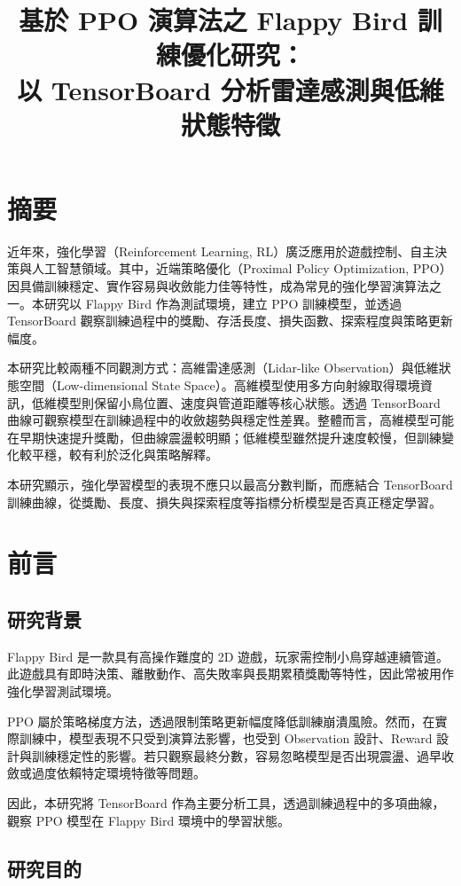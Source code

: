 \documentclass[12pt,a4paper]{ctexart}
\title{基於 PPO 演算法之 Flappy Bird 訓練優化研究：\\以 TensorBoard 分析雷達感測與低維狀態特徵}
\author{}
\date{}
\begin{document}
\maketitle

\section*{摘要}

近年來，強化學習（Reinforcement Learning, RL）廣泛應用於遊戲控制、自主決策與人工智慧領域。其中，近端策略優化（Proximal Policy Optimization, PPO）因具備訓練穩定、實作容易與收斂能力佳等特性，成為常見的強化學習演算法之一。本研究以 Flappy Bird 作為測試環境，建立 PPO 訓練模型，並透過 TensorBoard 觀察訓練過程中的獎勵、存活長度、損失函數、探索程度與策略更新幅度。

本研究比較兩種不同觀測方式：高維雷達感測（Lidar-like Observation）與低維狀態空間（Low-dimensional State Space）。高維模型使用多方向射線取得環境資訊，低維模型則保留小鳥位置、速度與管道距離等核心狀態。透過 TensorBoard 曲線可觀察模型在訓練過程中的收斂趨勢與穩定性差異。整體而言，高維模型可能在早期快速提升獎勵，但曲線震盪較明顯；低維模型雖然提升速度較慢，但訓練變化較平穩，較有利於泛化與策略解釋。

本研究顯示，強化學習模型的表現不應只以最高分數判斷，而應結合 TensorBoard 訓練曲線，從獎勵、長度、損失與探索程度等指標分析模型是否真正穩定學習。

\section{前言}

\subsection{研究背景}

Flappy Bird 是一款具有高操作難度的 2D 遊戲，玩家需控制小鳥穿越連續管道。此遊戲具有即時決策、離散動作、高失敗率與長期累積獎勵等特性，因此常被用作強化學習測試環境。

PPO 屬於策略梯度方法，透過限制策略更新幅度降低訓練崩潰風險。然而，在實際訓練中，模型表現不只受到演算法影響，也受到 Observation 設計、Reward 設計與訓練穩定性的影響。若只觀察最終分數，容易忽略模型是否出現震盪、過早收斂或過度依賴特定環境特徵等問題。

因此，本研究將 TensorBoard 作為主要分析工具，透過訓練過程中的多項曲線，觀察 PPO 模型在 Flappy Bird 環境中的學習狀態。

\subsection{研究目的}
\end{document}
